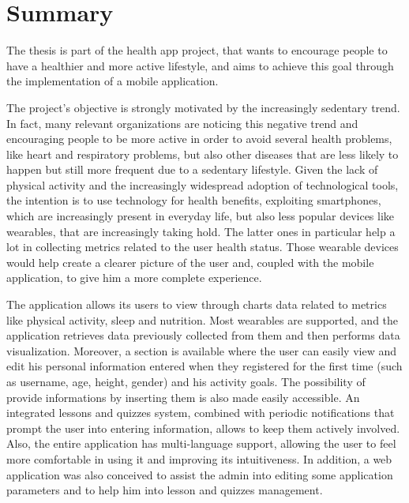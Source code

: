 \section{Summary}

The thesis is part of the health app project, that wants to encourage people to have a healthier and more active lifestyle, and aims to achieve this goal through the implementation of a mobile application.
\vspace{2ex}

\noindent The project's objective is strongly motivated by the increasingly sedentary trend. In fact, many relevant organizations are noticing this negative trend and encouraging people to be more active in order to avoid several health problems, like heart and respiratory problems, but also other diseases that are less likely to happen but still more frequent due to a sedentary lifestyle. Given the lack of physical activity and the increasingly widespread adoption of technological tools, the intention is to use technology for health benefits, exploiting smartphones, which are increasingly present in everyday life, but also less popular devices like wearables, that are increasingly taking hold. The latter ones in particular help a lot in collecting metrics related to the user health status. Those wearable devices would help create a clearer picture of the user and, coupled with the mobile application, to give him a more complete experience. 
\vspace{2ex}

\noindent The application allows its users to view through charts data related to metrics like physical activity, sleep and nutrition. Most wearables are supported, and the application retrieves data previously collected from them and then performs data visualization. Moreover, a section is available where the user can easily view and edit his personal information entered when they registered for the first time (such as username, age, height, gender) and his activity goals. The possibility of provide informations by inserting them is also made easily accessible. An integrated lessons and quizzes system, combined with periodic notifications that prompt the user into entering information, allows to keep them actively involved. Also, the entire application has multi-language support, allowing the user to feel more comfortable in using it and improving its intuitiveness. In addition, a web application was also conceived to assist the admin into editing some application parameters and to help him into lesson and quizzes management. 
\newpage

